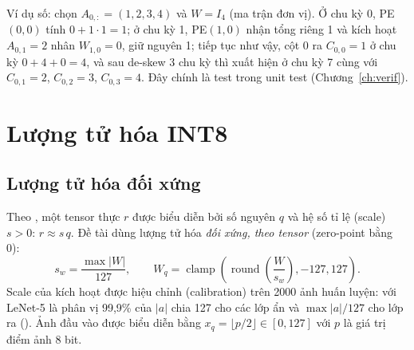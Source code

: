 Ví dụ số: chọn $A_{0,:}=(1,2,3,4)$ và $W=I_4$ (ma trận đơn vị). Ở chu kỳ 0, PE$(0,0)$ tính $0+1\cdot1=1$; ở chu kỳ 1, PE$(1,0)$ nhận tổng riêng 1 và kích hoạt $A_{0,1}=2$ nhân $W_{1,0}=0$, giữ nguyên 1; tiếp tục như vậy, cột 0 ra $C_{0,0}=1$ ở chu kỳ $0+4+0=4$, và sau de-skew 3 chu kỳ thì xuất hiện ở chu kỳ 7 cùng với $C_{0,1}=2$, $C_{0,2}=3$, $C_{0,3}=4$. Đây chính là test  trong unit test (Chương~\ref{ch:verif}).

\section{Lượng tử hóa INT8}
\label{sec:quant}
\subsection{Lượng tử hóa đối xứng}
Theo \cite{jacob2018quant,krishnamoorthi2018}, một tensor thực $r$ được biểu diễn bởi số nguyên $q$ và hệ số tỉ lệ (scale) $s>0$: $r \approx s\,q$. Đề tài dùng lượng tử hóa \emph{đối xứng, theo tensor} (zero-point bằng 0):
\begin{equation}
  s_w = \frac{\max|W|}{127},\qquad W_q = \operatorname{clamp}\!\left(\operatorname{round}\!\left(\frac{W}{s_w}\right),-127,127\right).
\end{equation}
Scale của kích hoạt được hiệu chỉnh (calibration) trên \num{2000} ảnh huấn luyện: với LeNet-5 là phân vị 99,9\% của $|a|$ chia 127 cho các lớp ẩn và $\max|a|/127$ cho lớp ra (). Ảnh đầu vào được biểu diễn bằng $x_q=\lfloor p/2\rfloor\in[0,127]$ với $p$ là giá trị điểm ảnh 8 bit.

